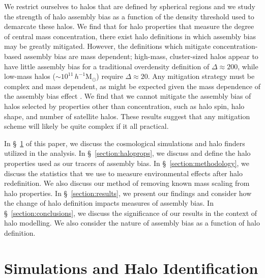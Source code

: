 \documentclass[usenatbib,fleqn]{mnras}
\begin{document}
We restrict ourselves to halos that are defined by spherical regions and we study the strength of halo assembly bias as a function of the density threshold used to demarcate these halos. We find that for halo properties that measure the degree of central mass concentration, there exist halo definitions in which assembly bias may be 
greatly mitigated. However, the definitions which mitigate concentration-based assembly bias are mass dependent; high-mass, cluster-sized halos appear to have little assembly bias 
for a traditional overdensity definition of $\Delta \approx 200$, 
while low-mass halos ($\sim 10^{11}\, h^{-1}\mathrm{M}_{\odot}$) require 
$\Delta \approx 20$. Any mitigation strategy must be complex and mass dependent, as might be expected given the mass dependence of the assembly bias effect \cite{wechsler_etal06}. 
We find that we cannot mitigate the assembly bias of halos selected by properties other than concentration, such as halo spin, halo shape, and number of satellite halos. These results suggest that any mitigation scheme will likely be quite complex if it all practical. 

 
In \S~\ref{section:data} of this paper, we discuss the cosmological simulations and halo finders
utilized in the analysis. In \S~\ref{section:haloprops}, we discuss 
and define the halo properties used as our tracers of assembly bias. In \S~\ref{section:methodology}, 
we discuss the statistics that we use to measure environmental effects after
halo redefinition. We also discuss our method of removing known mass scaling from halo properties.
In \S~\ref{section:results}, we present our findings and consider how the change
of halo definition impacts measures of assembly bias. In
\S~\ref{section:conclusions}, we discuss the significance of our results in the context of halo modelling.
 We also consider the nature of assembly bias as a function of halo definition.





\section[]{Simulations and Halo Identification}
\label{section:data}
\end{document}

